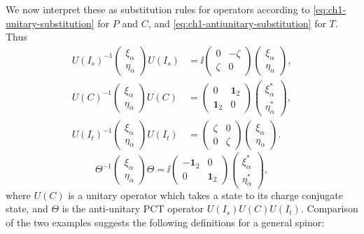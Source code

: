 We now interpret these as substitution rules for operators according to
\eqref{eq:ch1-unitary-substitution} for $P$ and $C$, and \eqref{eq:ch1-antiunitary-substitution} for $T$. Thus
\begin{equation}
\begin{aligned}
  U(I_s)^{-1}
  \begin{pmatrix}\xi_\alpha\\\eta_{\dot\alpha}\end{pmatrix}
  U(I_s)
  &=
  \ii\begin{pmatrix}0&-\zeta\\\zeta&0\end{pmatrix}
  \begin{pmatrix}\xi_\alpha\\\eta_{\dot\alpha}\end{pmatrix},\\
  U(C)^{-1}
  \begin{pmatrix}\xi_\alpha\\\eta_{\dot\alpha}\end{pmatrix}
  U(C)
  &=
  \begin{pmatrix}0&\mathbf{1}_2\\\mathbf{1}_2&0\end{pmatrix}
  \begin{pmatrix}\xi_\alpha^*\\\eta_{\dot\alpha}^*\end{pmatrix},\\
  U(I_t)^{-1}
  \begin{pmatrix}\xi_\alpha\\\eta_{\dot\alpha}\end{pmatrix}
  U(I_t)
  &=
  \begin{pmatrix}\zeta&0\\0&\zeta\end{pmatrix}
  \begin{pmatrix}\xi_\alpha\\\eta_{\dot\alpha}\end{pmatrix}.
\end{aligned}
\tag{1-48}\label{eq:ch1-two-component-operator-rules}
\end{equation}
\begin{equation}
  \Theta^{-1}
  \begin{pmatrix}\xi_\alpha\\\eta_{\dot\alpha}\end{pmatrix}
  \Theta
  =
  \ii\begin{pmatrix}-\mathbf{1}_2&0\\0&\mathbf{1}_2\end{pmatrix}
  \begin{pmatrix}\xi_\alpha^*\\\eta_{\dot\alpha}^*\end{pmatrix},
  \tag{1-49}\label{eq:ch1-two-component-pct-operator}
\end{equation}
where $U(C)$ is a unitary operator which takes a state to its charge conjugate
state, and $\Theta$ is the anti-unitary $\mathrm{PCT}$ operator
$U(I_s)U(C)U(I_t)$. Comparison of the two examples suggests the following
definitions for a general spinor:

